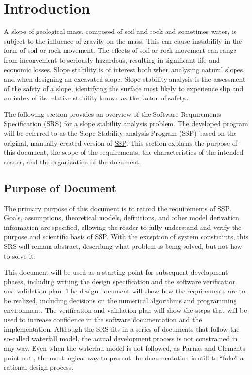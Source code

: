 \documentclass[12pt]{article}
\begin{document}
\section{Introduction}
\label{Sec:Intro}
A slope of geological mass, composed of soil and rock and sometimes water, is subject to the influence of gravity on the mass. This can cause instability in the form of soil or rock movement. The effects of soil or rock movement can range from inconvenient to seriously hazardous, resulting in significant life and economic losses. Slope stability is of interest both when analysing natural slopes, and when designing an excavated slope. Slope stability analysis is the assessment of the safety of a slope, identifying the surface most likely to experience slip and an index of its relative stability known as the factor of safety..

The following section provides an overview of the Software Requirements Specification (SRS) for a slope stability analysis problem. The developed program will be referred to as the Slope Stability analysis Program (SSP) based on the original, manually created version of \hyperref{https://github.com/smiths/caseStudies/tree/main/CaseStudies/ssp}{}{}{SSP}. This section explains the purpose of this document, the scope of the requirements, the characteristics of the intended reader, and the organization of the document.

\subsection{Purpose of Document}
\label{Sec:DocPurpose}
The primary purpose of this document is to record the requirements of SSP. Goals, assumptions, theoretical models, definitions, and other model derivation information are specified, allowing the reader to fully understand and verify the purpose and scientific basis of SSP. With the exception of \hyperref[Sec:SysConstraints]{system constraints}, this SRS will remain abstract, describing what problem is being solved, but not how to solve it.

This document will be used as a starting point for subsequent development phases, including writing the design specification and the software verification and validation plan. The design document will show how the requirements are to be realized, including decisions on the numerical algorithms and programming environment. The verification and validation plan will show the steps that will be used to increase confidence in the software documentation and the implementation. Although the SRS fits in a series of documents that follow the so-called waterfall model, the actual development process is not constrained in any way. Even when the waterfall model is not followed, as Parnas and Clements point out \cite{parnasClements1986}, the most logical way to present the documentation is still to ``fake'' a rational design process.
\end{document}
